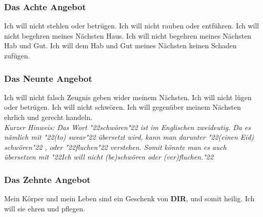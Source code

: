 \documentclass[10pt,a5paper]{article}
\newcommand{\Dir}[0]{\textbf{DIR}}
\newcommand{\q}[1]{\char"22{#1}\char"22 }
\begin{document}
	\subsubsection{Das Achte Angebot}
		Ich will nicht stehlen oder betr\"ugen.
		Ich will nicht rauben oder entf\"uhren.
		Ich will nicht begehren meines N\"achsten Haus.
		Ich will nicht begehren meines N\"achsten Hab und Gut.
		Ich will dem Hab und Gut meines N\"achsten keinen Schaden zuf\"ugen.
		
	\subsubsection{Das Neunte Angebot} \label{DasNeunteAngebot}
		Ich will nicht falsch Zeugnis geben wider meinem N\"achsten.
		Ich will nicht l\"ugen oder betr\"ugen.
		Ich will nicht schw\"oren.
		Ich will gegen\"uber meinem N\"achsten ehrlich und gerecht handeln.
		\\
		\textit{Kurzer Hinweis:
		Das Wort \q{schw\"oren} ist im Englischen zweideutig.
		Da es n\"amlich mit \q{(to) swear} \"ubersetzt wird,
		kann man darunter \q{(einen Eid) schw\"oren},
		oder \q{fluchen} verstehen.
		Somit k\"onnte man es auch \"ubersetzen mit
		\q{Ich will nicht (be)schw\"oren oder (ver)fluchen.}}
		
	\subsubsection{Das Zehnte Angebot} \label{DasZehnteAngebot}
		Mein K\"orper und mein Leben sind ein Geschenk von {\Dir},
		und somit heilig.
		Ich will sie ehren und pflegen.
	
\end{document}
